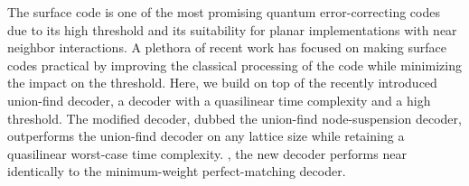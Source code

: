 The surface code is one of the most promising quantum error-correcting codes due to its high threshold and its suitability for planar implementations with near neighbor interactions. A plethora of recent work has focused on making surface codes practical by improving the classical processing of the code while minimizing the impact on the threshold. Here, we build on top of the recently introduced union-find decoder, a decoder with a quasilinear time complexity and a high threshold. The modified decoder, dubbed the union-find node-suspension decoder, outperforms the union-find decoder on any lattice size while retaining a quasilinear worst-case time complexity. , the new decoder performs near identically to the minimum-weight perfect-matching decoder.


